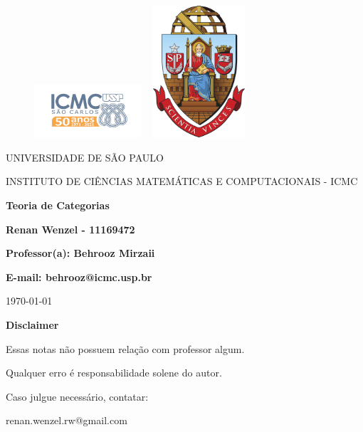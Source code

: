 \documentclass{article}
\begin{document}
\begin{figure}[ht]
	\includegraphics[width=4cm]{../icmc.png}
	\hspace{7cm}
	\includegraphics[height=4.9cm,width=4cm]{../brasao_usp_cor.jpg}
	\endminipage
\end{figure}

\begin{center}
	\vspace{1cm}
	\LARGE
	UNIVERSIDADE DE SÃO PAULO

	\vspace{1.3cm}
	\LARGE
	INSTITUTO DE CIÊNCIAS MATEMÁTICAS E COMPUTACIONAIS - ICMC

	\vspace{1.7cm}
	\Large
	\textbf{Teoria de Categorias}

	\vspace{1.3cm}
	\large
	\textbf{Renan Wenzel - 11169472}

	\vspace{1.3cm}
	\large
	\textbf{Professor(a): Behrooz Mirzaii}

	\textbf{E-mail: behrooz@icmc.usp.br}

	\vspace{1.3cm}
	\today
\end{center}

\newpage
\textbf{{\Huge Disclaimer}}
\vspace{5cm}

{\huge Essas notas não possuem relação com professor algum.

	Qualquer erro é responsabilidade solene do autor.

	Caso julgue necessário, contatar:

	renan.wenzel.rw@gmail.com}
\tableofcontents

\newpage
\end{document}
